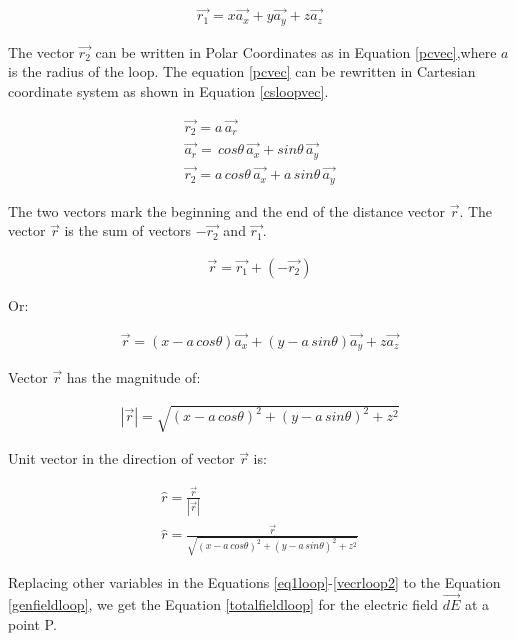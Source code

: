 \documentclass{ximera}
\begin{document}
\begin{eqnarray}
\vec{r_1}=x \vec{a_x} + y \vec{a_y} +z\vec{a_z} \label{eq1loop}
\end{eqnarray}

The vector $\vec{r_2}$ can be written in Polar Coordinates as in Equation \ref{pcvec},where $a$ is the radius of the loop. The equation \ref{pcvec} can be rewritten in Cartesian coordinate system as shown in Equation \ref{csloopvec}.

\begin{eqnarray}
\vec{r_2}=a \, \vec{a_r} \label{pcvec} \\
\vec{a_r}= \,cos{\theta} \, \vec{a_x}+ sin{\theta} \, \vec{a_y} \\
\vec{r_2}=a \, cos{\theta}\,  \vec{a_x}+ a \, sin{\theta} \, \vec{a_y} \label{csloopvec}
\end{eqnarray}

The two vectors mark the beginning and the end of the distance vector $\vec{r}$. The vector  $\vec{r}$ is the sum of vectors $-\vec{r_2}$ and $\vec{r_1}$. 



\begin{eqnarray}
\vec{r}=\vec{r_1} + (-\vec{r_2})
\end{eqnarray}

Or:

\begin{eqnarray}
\vec{r}= (x -  a \,cos{\theta}) \vec{a_x} +(y - a \,sin{\theta}) \vec{a_y} +z \vec{a_z}
\end{eqnarray}

Vector $\vec{r}$ has the magnitude of:


\begin{eqnarray}
|\vec{r}|= \sqrt{(x - a \,cos{\theta})^2 +(y - a \,sin{\theta})^2 +z ^2}\label{vecrloop1}
\end{eqnarray}

Unit vector in the direction of vector $\vec{r}$ is:


\begin{eqnarray}
\hat{r}= \frac{\vec{r}}{|\vec{r}|} \\
\hat{r}=\frac{\vec{r}}{\sqrt{(x - a \, cos{\theta})^2 +(y - a  \, sin{\theta})^2 +z^2}}\label{vecrloop2}
\end{eqnarray}


Replacing other variables in the Equations \ref{eq1loop}-\ref{vecrloop2} to the Equation \ref{genfieldloop}, we get the    Equation \ref{totalfieldloop} for the electric field $\vec{dE}$ at a point P.
\end{document}
